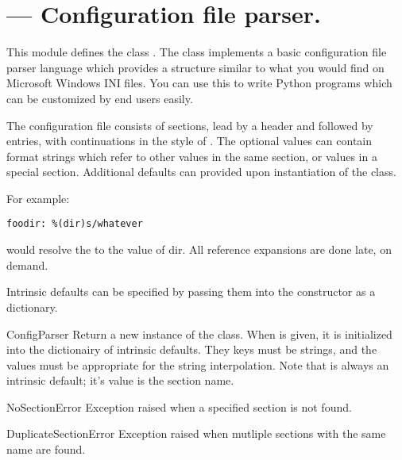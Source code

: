 \section{ ---
         Configuration file parser.}



This module defines the class . The
 class implements a basic configuration file
parser language which provides a structure similar to what you would
find on Microsoft Windows INI files.  You can use this to write Python 
programs which can be customized by end users easily.

The configuration file consists of sections, lead by a
\samp{[section]} header and followed by  entries,
with continuations in the style of .  The optional values 
can contain format strings which refer to other values in the same
section, or values in a special  section.  Additional
defaults can provided upon instantiation of the class.

For example:

\begin{verbatim}
foodir: %(dir)s/whatever
\end{verbatim}

would resolve the  to the value of dir. All reference
expansions are done late, on demand.

Intrinsic defaults can be specified by passing them into the
 constructor as a dictionary.

\begin{classdesc}{ConfigParser}{}
Return a new instance of the  class.  When
 is given, it is initialized into the dictionairy of
intrinsic defaults.  They keys must be strings, and the values must be 
appropriate for the  string interpolation.  Note that
 is always an intrinsic default; it's value is the 
section name.
\end{classdesc}

\begin{excdesc}{NoSectionError}
Exception raised when a specified section is not found.
\end{excdesc}

\begin{excdesc}{DuplicateSectionError}
Exception raised when mutliple sections with the same name are found.
\end{excdesc}

